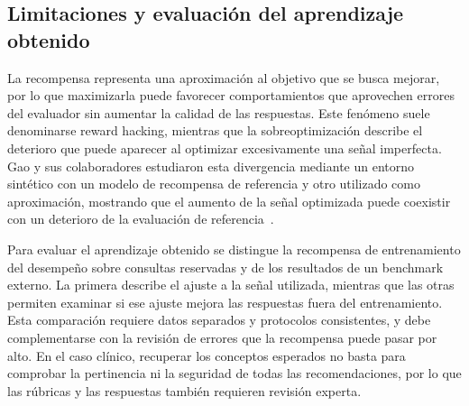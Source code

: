 \subsection{Limitaciones y evaluación del aprendizaje obtenido}
\label{sec:limites-rl}
La recompensa representa una aproximación al objetivo que se busca mejorar, por lo que maximizarla puede favorecer comportamientos que aprovechen errores del evaluador sin aumentar la calidad de las respuestas. Este fenómeno suele denominarse reward hacking, mientras que la sobreoptimización describe el deterioro que puede aparecer al optimizar excesivamente una señal imperfecta. Gao y sus colaboradores estudiaron esta divergencia mediante un entorno sintético con un modelo de recompensa de referencia y otro utilizado como aproximación, mostrando que el aumento de la señal optimizada puede coexistir con un deterioro de la evaluación de referencia~\cite{gao2022overoptimization}.

Para evaluar el aprendizaje obtenido se distingue la recompensa de entrenamiento del desempeño sobre consultas reservadas y de los resultados de un benchmark externo. La primera describe el ajuste a la señal utilizada, mientras que las otras permiten examinar si ese ajuste mejora las respuestas fuera del entrenamiento. Esta comparación requiere datos separados y protocolos consistentes, y debe complementarse con la revisión de errores que la recompensa puede pasar por alto. En el caso clínico, recuperar los conceptos esperados no basta para comprobar la pertinencia ni la seguridad de todas las recomendaciones, por lo que las rúbricas y las respuestas también requieren revisión experta.